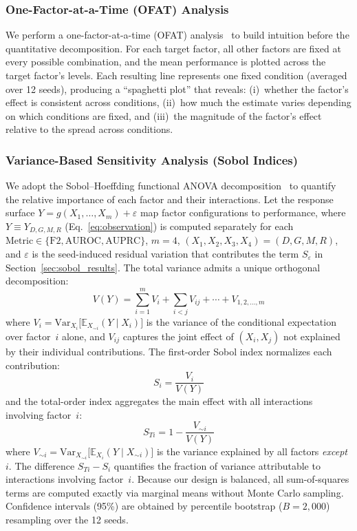 \documentclass[lettersize,journal]{IEEEtran}
\begin{document}
\subsubsection{One-Factor-at-a-Time (OFAT) Analysis}
We perform a one-factor-at-a-time (OFAT) analysis~\cite{saltelli2008} to build intuition before the quantitative decomposition.
For each target factor, all other factors are fixed at every possible combination, and the mean performance is plotted across the target factor's levels.
Each resulting line represents one fixed condition (averaged over 12 seeds), producing a ``spaghetti plot'' that reveals: (i)~whether the factor's effect is consistent across conditions, (ii)~how much the estimate varies depending on which conditions are fixed, and (iii)~the magnitude of the factor's effect relative to the spread across conditions.

\subsubsection{Variance-Based Sensitivity Analysis (Sobol Indices)}
We adopt the Sobol--Hoeffding functional ANOVA decomposition~\cite{sobol1993,saltelli2008} to quantify the relative importance of each factor and their interactions.
Let the response surface $Y = g(X_1, \ldots, X_m) + \varepsilon$ map factor configurations to performance, where $Y \equiv Y_{D,G,M,R}$ (Eq.~\eqref{eq:observation}) is computed separately for each $\mathrm{Metric} \in \{\mathrm{F2}, \mathrm{AUROC}, \mathrm{AUPRC}\}$, $m = 4$, $(X_1, X_2, X_3, X_4) = (D, G, M, R)$, and $\varepsilon$ is the seed-induced residual variation that contributes the term $S_{\varepsilon}$ in Section~\ref{sec:sobol_results}.
The total variance admits a unique orthogonal decomposition:
\begin{equation}
\label{eq:sobol_decomp}
V(Y) = \sum_{i=1}^{m} V_i + \sum_{i<j} V_{ij} + \cdots + V_{1,2,\ldots,m}
\end{equation}
where $V_i = \mathrm{Var}_{X_i}\bigl[\mathbb{E}_{X_{\sim i}}(Y \mid X_i)\bigr]$ is the variance of the conditional expectation over factor~$i$ alone, and $V_{ij}$ captures the joint effect of $(X_i, X_j)$ not explained by their individual contributions.
The first-order Sobol index normalizes each contribution:
\begin{equation}
\label{eq:sobol_first}
S_i = \frac{V_i}{V(Y)}
\end{equation}
and the total-order index aggregates the main effect with all interactions involving factor~$i$:
\begin{equation}
\label{eq:sobol_total}
S_{Ti} = 1 - \frac{V_{\sim i}}{V(Y)}
\end{equation}
where $V_{\sim i} = \mathrm{Var}_{X_{\sim i}}\bigl[\mathbb{E}_{X_i}(Y \mid X_{\sim i})\bigr]$ is the variance explained by all factors \emph{except}~$i$.
The difference $S_{Ti} - S_i$ quantifies the fraction of variance attributable to interactions involving factor~$i$.
Because our design is balanced, all sum-of-squares terms are computed exactly via marginal means without Monte Carlo sampling.
Confidence intervals (95\%) are obtained by percentile bootstrap ($B = 2{,}000$) resampling over the 12 seeds.
\end{document}
